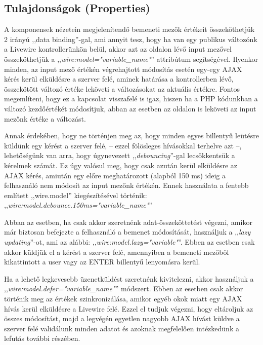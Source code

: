 \documentclass[
]{thesis-ekf}
\theoremstyle{definition}
\theoremstyle{remark}
\begin{document}
                \subsection{Tulajdonságok (Properties)}\cite{Livewire-Properties}
                A komponensek nézetein megjelenítendő bemeneti mezők értékeit összeköthetjük 2 irányú ,,data binding''-gal, ami annyit tesz, hogy ha van egy publikus változónk a Livewire kontrollerünkön belül, akkor azt az oldalon lévő input mezővel összeköthetjük a ,,\emph{wire:model="variable\_name"}'' attribútum segítségével. Ilyenkor minden, az input mező értékén végrehajtott módosítás esetén egy-egy AJAX kérés kerül elküldésre a szerver felé, aminek határása a kontrollerben lévő, összekötött változó értéke leköveti a változásokat az aktuális értékre. Fontos megemlíteni, hogy ez a kapcsolat visszafelé is igaz, hiszen ha a PHP kódunkban a változó kezdőértékét módosítjuk, abban az esetben az oldalon is leköveti az input mezőnk értéke a változást.

                Annak érdekében, hogy ne történjen meg az, hogy minden egyes billentyű leütésre küldünk egy kérést a szerver felé, -- ezzel fölösleges hívásokkal terhelve azt --, lehetőségünk van arra, hogy úgynevezett ,,\emph{debouncing}''-gal lecsökkentsük a kérelmek számát. Ez úgy valósul meg, hogy csak azután kerül elküldésre az AJAX kérés, amiután egy előre meghatározott (alapból 150 ms) ideig a felhasználó nem módosít az input mezőnk értékén. Ennek használata a fentebb említett ,,wire.model'' kiegészítésével történik: ,,\emph{wire:model.debounce.150ms="variable\_name"}''

                Abban az esetben, ha csak akkor szeretnénk adat-összeköttetést végezni, amikor már biztosan befejezte a felhasználó a bemenet módosítását, használjuk a ,,\emph{lazy updating}''-ot, ami az alábbi: ,,\emph{wire:model.lazy="variable"}''. Ebben az esetben csak akkor küldjük el a kérést a szerver felé, amennyiben a bemeneti mezőből kikattintott a user vagy az ENTER billentyű lenyomásra kerül.

                Ha a lehető legkevesebb üzenetküldést szeretnénk kivitelezni, akkor használjuk a ,,\emph{wire:model.defer="variable\_name"}'' módszert. Ebben az esetben csak akkor történik meg az értékek szinkronizálása, amikor egyéb okok miatt egy AJAX hívás kerül elküldésre a Livewire felé. Ezzel el tudjuk végezni, hogy eltároljuk az összes módosítást, majd a legvégén egyetlen nagyobb AJAX hívást küldve a szerver felé validálunk minden adatot és azoknak megfelelően intézkedünk a lefutás további részében.
                
\end{document}
